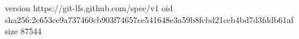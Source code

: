 version https://git-lfs.github.com/spec/v1
oid sha256:2c653ce9a737460cb903f74657ce541648e3a59b8fcbd21ceb4bd7d3fddb61af
size 87544

